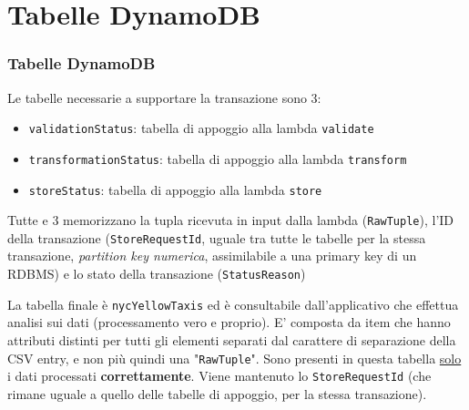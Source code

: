 \documentclass{beamer}
\newcommand{\dflvspace}{\vspace{10pt}}
\begin{document}
\section{Tabelle DynamoDB}
\begin{frame}
    \frametitle{Tabelle DynamoDB}

    \fontsize{9pt}{10pt}\selectfont

    Le tabelle necessarie a supportare la transazione sono 3:
    \begin{itemize}
        \item \texttt{validationStatus}: tabella di appoggio alla lambda \texttt{validate}
        \item \texttt{transformationStatus}: tabella di appoggio alla lambda \texttt{transform}
        \item \texttt{storeStatus}: tabella di appoggio alla lambda \texttt{store}
    \end{itemize}

    Tutte e 3 memorizzano la tupla ricevuta in input dalla lambda (\texttt{RawTuple}), l'ID della transazione 
    (\texttt{StoreRequestId}, uguale tra tutte le tabelle per la stessa transazione, \textit{partition key numerica}, assimilabile a una primary key di un RDBMS) e lo stato della transazione (\texttt{StatusReason})

    \dflvspace
    
    La tabella finale è \texttt{nycYellowTaxis} ed è consultabile dall'applicativo che effettua analisi sui
    dati (processamento vero e proprio). E' composta da item che hanno attributi distinti per tutti gli elementi
    separati dal carattere di separazione della CSV entry, e non più quindi una "\texttt{RawTuple}". Sono presenti in questa
    tabella \underline{solo} i dati processati \textbf{correttamente}. Viene mantenuto lo \texttt{StoreRequestId} (che rimane uguale a quello delle tabelle di appoggio, per la stessa transazione).
\end{frame}
\end{document}
